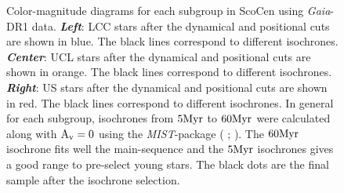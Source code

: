 \begin{figure}[!ht]
\centering
\caption{\scriptsize{Color-magnitude diagrams for each subgroup in ScoCen using \textit{Gaia}-DR1 data. \textit{\textbf{Left}}: LCC stars after the dynamical and positional cuts are shown in blue. The black lines correspond to different isochrones. \textit{\textbf{Center}}: UCL stars after the dynamical and positional cuts are shown in orange. The black lines correspond to different isochrones. \textit{\textbf{Right}}: US stars after the dynamical and positional cuts are shown in red. The black lines correspond to different isochrones. In general for each subgroup, isochrones from $5 \textnormal{Myr}$ to $60 \textnormal{Myr}$ were calculated along with $\textnormal{A}_\textnormal{v} = 0$ using the \textit{MIST}-package ( \citeyear{2016ApJS..222....8D};  \citeyear{2016ApJ...823..102C}). The $60 \textnormal{Myr}$ isochrone fits well the main-sequence and the $5 \textnormal{Myr}$ isochrones gives a good range to pre-select young stars. The black dots are the final sample after the isochrone selection.}}
\label{fig:Isochrones_1_appendix}
\end{figure}

